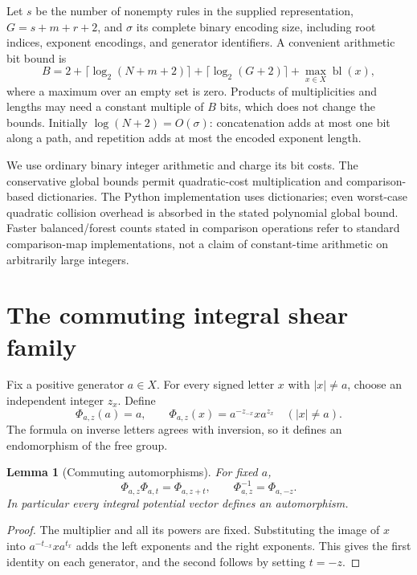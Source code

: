 \documentclass[11pt,letterpaper]{article}
\newtheorem{lemma}[theorem]{Lemma}
\theoremstyle{definition}
\theoremstyle{remark}\newtheorem{remark}[theorem]{Remark}
\newcommand{\bl}{\operatorname{bl}}
\begin{document}
Let $s$ be the number of nonempty rules in the supplied representation,
$G=s+m+r+2$, and $\sigma$ its complete binary encoding size, including root
indices, exponent encodings, and generator identifiers. A convenient
arithmetic bit bound is
\begin{equation}
 B=2+\lceil\log_2(N+m+2)\rceil+\lceil\log_2(G+2)\rceil
       +\max_{x\in X}\bl(x),
 \label{eq:bits}
\end{equation}
where a maximum over an empty set is zero. Products of multiplicities and
lengths may need a constant multiple of $B$ bits, which does not change the
bounds. Initially $\log(N+2)=O(\sigma)$: concatenation adds at most one bit
along a path, and repetition adds at most the encoded exponent length.

We use ordinary binary integer arithmetic and charge its bit costs. The
conservative global bounds permit quadratic-cost multiplication and
comparison-based dictionaries. The Python implementation uses dictionaries;
even worst-case quadratic collision overhead is absorbed in the stated
polynomial global bound. Faster balanced/forest counts stated in comparison
operations refer to standard comparison-map implementations, not a claim of
constant-time arithmetic on arbitrarily large integers.

\section{The commuting integral shear family}
\label{sec:shear}

Fix a positive generator $a\in X$. For every signed letter $x$ with
$|x|\ne a$, choose an independent integer $z_x$. Define
\begin{equation}
 \Phi_{a,z}(a)=a,\qquad
 \Phi_{a,z}(x)=a^{-z_{-x}}x a^{z_x} \quad (|x|\ne a).
 \label{eq:shear}
\end{equation}
The formula on inverse letters agrees with inversion, so it defines an
endomorphism of the free group.

\begin{lemma}[Commuting automorphisms]
For fixed $a$,
\[
 \Phi_{a,z}\Phi_{a,t}=\Phi_{a,z+t},\qquad
 \Phi_{a,z}^{-1}=\Phi_{a,-z}.
\]
In particular every integral potential vector defines an automorphism.
\end{lemma}
\begin{proof}
The multiplier and all its powers are fixed. Substituting the image of $x$
into $a^{-t_{-x}}x a^{t_x}$ adds the left exponents and the right exponents.
This gives the first identity on each generator, and the second follows by
setting $t=-z$.
\end{proof}
\end{document}
